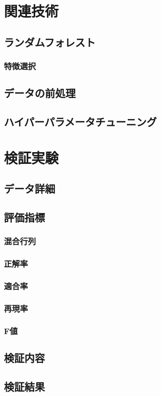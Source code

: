 \documentclass[platex]{suribt}
\begin{document}
\chapter{関連技術}
\section{ランダムフォレスト}
\subsection{特徴選択}
\section{データの前処理}
\section{ハイパーパラメータチューニング}

\chapter{検証実験}
\section{データ詳細}
\section{評価指標}
\subsection{混合行列}
\subsection{正解率}
\subsection{適合率}
\subsection{再現率}
\subsection{F値}
\section{検証内容}
\section{検証結果}
\end{document}
